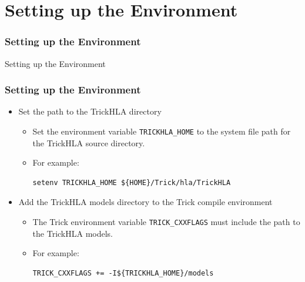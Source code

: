 \documentclass{beamer}
\begin{document}
   \section{Setting up the Environment}

   \begin{frame}
      \frametitle{Setting up the Environment}
      \begin{center}
      \Huge{Setting up the Environment}
      \end{center}
   \end{frame}
   
   \begin{frame}[fragile]
      \frametitle{Setting up the Environment}
      \begin{itemize}
         \item Set the path to the TrickHLA directory
         \begin{itemize}
            \item Set the environment variable \texttt{TRICKHLA\_HOME} to the system file path for the TrickHLA source directory.
            \item For example:
\begin{Verbatim}[frame=single]
setenv TRICKHLA_HOME ${HOME}/Trick/hla/TrickHLA
\end{Verbatim}
         \end{itemize}
         \item Add the TrickHLA models directory to the Trick compile environment
         \begin{itemize}
            \item The Trick environment variable \texttt{TRICK\_CXXFLAGS} must include the path to the TrickHLA models.
            \item For example:
\begin{Verbatim}[frame=single]
TRICK_CXXFLAGS += -I${TRICKHLA_HOME}/models
\end{Verbatim}
         \end{itemize}
      \end{itemize}
   \end{frame}
   
\end{document}
